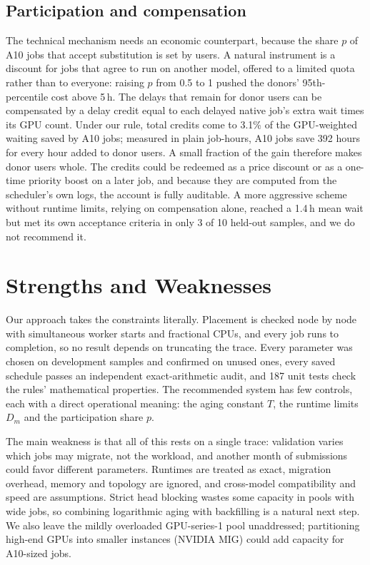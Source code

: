 \documentclass[11pt,a4paper]{article}
\begin{document}
\subsection{Participation and compensation}

The technical mechanism needs an economic counterpart, because the share $p$ of A10 jobs that accept substitution is set by users. A natural instrument is a discount for jobs that agree to run on another model, offered to a limited quota rather than to everyone: raising $p$ from 0.5 to 1 pushed the donors' 95th-percentile cost above 5\,h. The delays that remain for donor users can be compensated by a delay credit equal to each delayed native job's extra wait times its GPU count. Under our rule, total credits come to 3.1\% of the GPU-weighted waiting saved by A10 jobs; measured in plain job-hours, A10 jobs save 392 hours for every hour added to donor users. A small fraction of the gain therefore makes donor users whole. The credits could be redeemed as a price discount or as a one-time priority boost on a later job, and because they are computed from the scheduler's own logs, the account is fully auditable. A more aggressive scheme without runtime limits, relying on compensation alone, reached a 1.4\,h mean wait but met its own acceptance criteria in only 3 of 10 held-out samples, and we do not recommend it.

\section{Strengths and Weaknesses}

Our approach takes the constraints literally. Placement is checked node by node with simultaneous worker starts and fractional CPUs, and every job runs to completion, so no result depends on truncating the trace. Every parameter was chosen on development samples and confirmed on unused ones, every saved schedule passes an independent exact-arithmetic audit, and 187 unit tests check the rules' mathematical properties. The recommended system has few controls, each with a direct operational meaning: the aging constant $T$, the runtime limits $D_m$ and the participation share $p$.

The main weakness is that all of this rests on a single trace: validation varies which jobs may migrate, not the workload, and another month of submissions could favor different parameters. Runtimes are treated as exact, migration overhead, memory and topology are ignored, and cross-model compatibility and speed are assumptions. Strict head blocking wastes some capacity in pools with wide jobs, so combining logarithmic aging with backfilling is a natural next step. We also leave the mildly overloaded GPU-series-1 pool unaddressed; partitioning high-end GPUs into smaller instances (NVIDIA MIG) could add capacity for A10-sized jobs.
\end{document}

